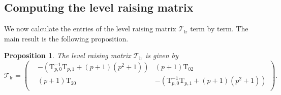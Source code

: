 \documentclass[10pt]{amsart}
\numberwithin{equation}{section}
\newtheorem{proposition}[equation]{Proposition}
\theoremstyle{definition}
\def\calT{\mathcal{T}}
\def\rmT{\mathrm{T}}
\begin{document}
\subsection{Computing the level raising matrix} We now calculate the entries of the level raising  matrix $\calT_{\mathrm{lr}}$ term by term. The main result is the following proposition.

\begin{proposition}\label{lr-matrix}
The level raising matrix $\calT_{\mathrm{lr}}$ is given by
\begin{equation*}
\calT_{\mathrm{lr}}=\begin{pmatrix} &-(\rmT^{-1}_{p,0}\rmT_{p,1}+(p+1)(p^{2}+1)) & (p+1)\rmT_{02}\\ &(p+1)\rmT_{20}& -(\rmT^{-1}_{p,0}\rmT_{p,1}+(p+1)(p^{2}+1))\\ \end{pmatrix}.
\end{equation*}
\end{proposition}
\end{document}
